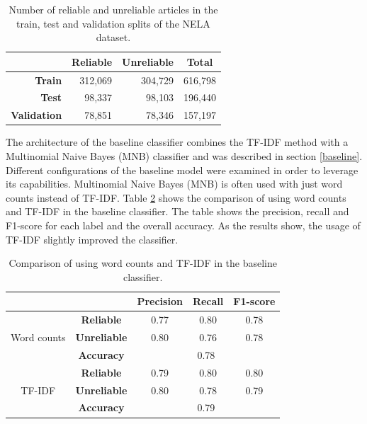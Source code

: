 \begin{table}[H]
    \centering
\begin{tabular}{r|r|r|r|}
\cline{2-4}
\multicolumn{1}{c|}{} & \multicolumn{1}{c|}{\textbf{Reliable}} & \multicolumn{1}{c|}{\textbf{Unreliable}} & \multicolumn{1}{c|}{\textbf{Total}} \\ \hline
\multicolumn{1}{|r|}{\textbf{Train}}      & 312,069 & 304,729 & 616,798 \\ \hline
\multicolumn{1}{|r|}{\textbf{Test}}       & 98,337  & 98,103  & 196,440 \\ \hline
\multicolumn{1}{|r|}{\textbf{Validation}} & 78,851  & 78,346  & 157,197 \\ \hline
\end{tabular}
    \caption{Number of reliable and unreliable articles in the train, test and validation splits of the NELA dataset.}
    \label{tab:nela_val_test}
\end{table}

The architecture of the baseline classifier combines the TF-IDF method with a Multinomial Naive Bayes (MNB) classifier and was described in section \ref{baseline}.
Different configurations of the baseline model were examined in order to leverage its capabilities. Multinomial Naive Bayes (MNB) is often used with just word counts instead of TF-IDF. Table \ref{tab:baseline_tf-idf} shows the comparison of using word counts and TF-IDF in the baseline classifier.
The table shows the precision, recall and F1-score for each label and the overall accuracy. As the results show, the usage of TF-IDF slightly improved the classifier. 

\begin{table}[H]
    \centering
\begin{tabular}{cc|c|c|c|}
\cline{3-5}
                                        &                     & \textbf{Precision} & \textbf{Recall} & \textbf{F1-score} \\ \hline
\multicolumn{1}{|c|}{\multirow{3}{*}{Word counts}} & \textbf{Reliable}   & 0.77               & 0.80            & 0.78              \\ \cline{2-5} 
\multicolumn{1}{|c|}{}                  & \textbf{Unreliable} & 0.80               & 0.76            & 0.78              \\ \cline{2-5} 
\multicolumn{1}{|c|}{}                  & \textbf{Accuracy}   & \multicolumn{3}{c|}{0.78}                                \\ \hline \hline
\multicolumn{1}{|c|}{\multirow{3}{*}{TF-IDF}} & \textbf{Reliable}   & 0.79               & 0.80            & 0.80              \\ \cline{2-5} 
\multicolumn{1}{|c|}{}                  & \textbf{Unreliable} & 0.80               & 0.78            & 0.79              \\ \cline{2-5} 
\multicolumn{1}{|c|}{}                  & \textbf{Accuracy}   & \multicolumn{3}{c|}{0.79}                                \\ \hline
\end{tabular}
    \caption{Comparison of using word counts and TF-IDF in the baseline classifier.}
    \label{tab:baseline_tf-idf}
\end{table}

